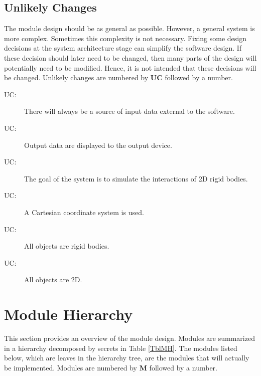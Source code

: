 \documentclass[12pt]{article}
\newcounter{ucnum}
\newcommand{\uctheucnum}{UC\theucnum}
\newcommand{\authornote}[3]{\textcolor{#1}{[#3 ---#2]}}
\newcommand{\authornote}[3]{}
\newcommand{\olu}[1]{\authornote{red}{OO}{#1}}
\begin{document}
\subsection{Unlikely Changes} \label{SecUchange}

The module design should be as general as possible. However, a general system is
more complex. Sometimes this complexity is not necessary. Fixing some design
decisions at the system architecture stage can simplify the software design. If
these decision should later need to be changed, then many parts of the design
will potentially need to be modified. Hence, it is not intended that these
decisions will be changed.  Unlikely changes are numbered by \textbf{UC}
followed by a number.

\begin{description}
\item[ \uctheucnum \label{ucInput}:] There will always be a source of input data external to the software.
\item[ \uctheucnum \label{ucOutput}:] Output data are
  displayed to the output device.
\item[ \uctheucnum \label{ucGoal}:] The goal of the system is to simulate the interactions of 2D rigid bodies.
\item[ \uctheucnum \label{ucCartesian}:] A Cartesian 
coordinate system is used.
\item[ \uctheucnum \label{ucRigid}:] All objects
are rigid bodies.
\item[ \uctheucnum \label{uc2D}:] All objects
are 2D.
\end{description}

\section{Module Hierarchy} \label{SecMH}

This section provides an overview of the module design. Modules are summarized
in a hierarchy decomposed by secrets in Table \ref{TblMH}. The modules listed
below, which are leaves in the hierarchy tree, are the modules that will
actually be implemented.  Modules are numbered by \textbf{M}
followed by a number.
\end{document}
